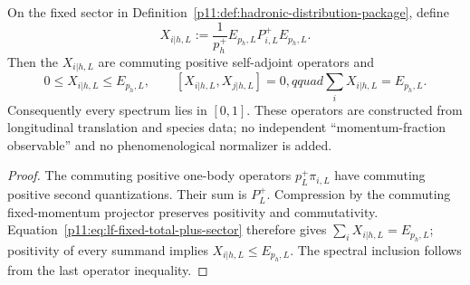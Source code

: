 \documentclass[12pt,a4paper]{article}
\begin{document}
\begin{theorem}
\label{p11:thm:constructed-light-front-fraction-operators}
On the fixed sector in Definition~\ref{p11:def:hadronic-distribution-package},
define
\begin{equation}
\label{p11:eq:constructed-total-fraction-operators}
X_{i|h,L}:=\frac{1}{p_h^+}
E_{p_h,L}P_{i,L}^+E_{p_h,L} .
\end{equation}
Then the \(X_{i|h,L}\) are commuting positive self-adjoint operators and
\begin{equation}
\label{p11:eq:fraction-operator-simplex}
0\le X_{i|h,L}\le E_{p_h,L},\qquad
[X_{i|h,L},X_{j|h,L}]=0,qquad
\sum_iX_{i|h,L}=E_{p_h,L}.
\end{equation}
Consequently every spectrum lies in \([0,1]\).  These operators are constructed
from longitudinal translation and species data; no independent
``momentum-fraction observable'' and no phenomenological normalizer is added.
\end{theorem}
\begin{proof}
The commuting positive one-body operators \(p_L^+\pi_{i,L}\) have commuting
positive second quantizations.  Their sum is \(P_L^+\).  Compression by the
commuting fixed-momentum projector preserves positivity and commutativity.
Equation~\eqref{p11:eq:lf-fixed-total-plus-sector} therefore gives
\(\sum_iX_{i|h,L}=E_{p_h,L}\); positivity of every summand implies
\(X_{i|h,L}\le E_{p_h,L}\).  The spectral inclusion follows from the last
operator inequality.
\end{proof}
\end{document}

